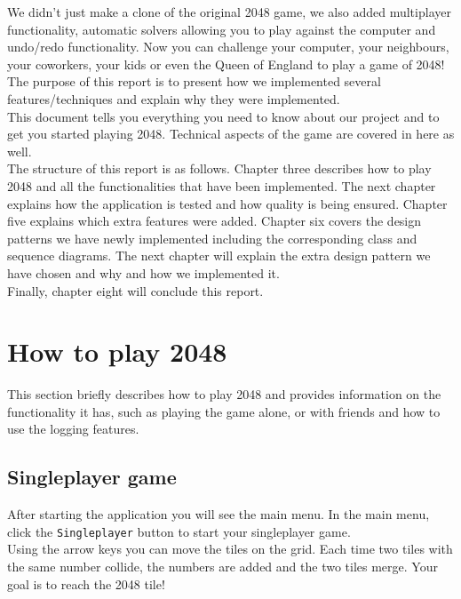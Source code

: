 \documentclass[a4paper,11pt,report]{scrartcl}
\begin{document}
We didn't just make a clone of the original 2048 game, we also added
multiplayer functionality, automatic solvers allowing you to play against the computer and 
undo/redo functionality. 
Now you can challenge your computer, your neighbours, your
coworkers, your kids or even the Queen of England to play a game of 2048!\\

The purpose of this report is to present how we implemented several features/techniques and explain why they were implemented.\\
This document tells you everything you need to know about our project and to get you started playing 2048. Technical aspects of the game are covered in here as well.\\

 The structure of this report is as follows. Chapter three describes how to play 2048 and all the functionalities that have been implemented. The next chapter explains how the application is tested and how quality is being ensured. Chapter five explains which extra features were added. Chapter six covers the design patterns we have newly implemented including the corresponding class and sequence diagrams. The next chapter will explain the extra design pattern we have chosen and why and how we implemented it.\\
Finally, chapter eight will conclude this report. \\

\newpage\section{How to play 2048}

This section briefly describes how to play 2048 and provides information on
the functionality it has, such as playing the game alone, or with friends and how
to use the logging features.

\subsection{Singleplayer game}
After starting the application you will see the main menu. In the main menu,
click the \texttt{Singleplayer} button to start your singleplayer game.\\

Using the arrow keys you can move the tiles on the grid. Each time two tiles with the same
number collide, the numbers are added and the two tiles merge. Your goal is to
reach the 2048 tile!\\
\end{document}
